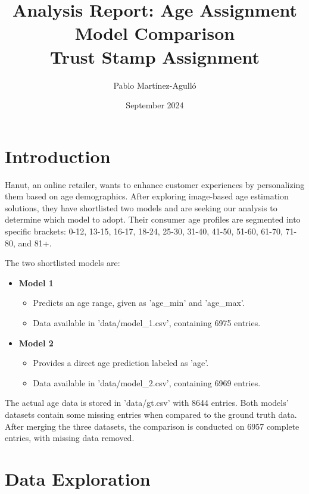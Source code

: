 \documentclass{article}
\title{Analysis Report: Age Assignment Model Comparison \\ Trust Stamp Assignment}
\author{Pablo Martínez-Agulló}
\date{September 2024}
\begin{document}
\maketitle

\section{Introduction}
Hanut, an online retailer, wants to enhance customer experiences by personalizing them based on age demographics. After exploring image-based age estimation solutions, they have shortlisted two models and are seeking our analysis to determine which model to adopt. Their consumer age profiles are segmented into specific brackets: 0-12, 13-15, 16-17, 18-24, 25-30, 31-40, 41-50, 51-60, 61-70, 71-80, and 81+.

The two shortlisted models are:
\begin{itemize}
    \item \textbf{Model 1}
    \begin{itemize}
        \item Predicts an age range, given as 'age\_min' and 'age\_max'.
        \item Data available in 'data/model\_1.csv', containing 6975 entries.
    \end{itemize}
    
    \item \textbf{Model 2}
    \begin{itemize}
        \item Provides a direct age prediction labeled as 'age'.
        \item Data available in 'data/model\_2.csv', containing 6969 entries.
    \end{itemize}
\end{itemize}

The actual age data is stored in 'data/gt.csv' with 8644 entries. Both models' datasets contain some missing entries when compared to the ground truth data. After merging the three datasets, the comparison is conducted on 6957 complete entries, with missing data removed.

\section{Data Exploration}

\end{document}
